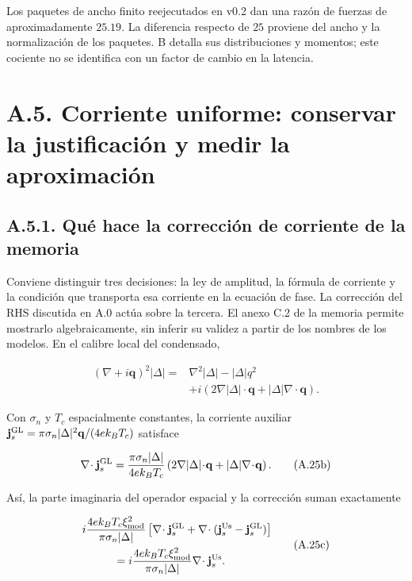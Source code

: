 \documentclass[
  spanish,
  10pt,
  a4paper,
]{article}
\begin{document}
Los paquetes de ancho finito reejecutados en v0.2 dan una razón de
fuerzas de aproximadamente \(25.19\). La diferencia respecto de \(25\)
proviene del ancho y la normalización de los paquetes. B detalla sus
distribuciones y momentos; este cociente no se identifica con un factor
de cambio en la latencia.

\section{A.5. Corriente uniforme: conservar la justificación y medir la
aproximación}\label{a.5.-corriente-uniforme-conservar-la-justificaciuxf3n-y-medir-la-aproximaciuxf3n}

\subsection{A.5.1. Qué hace la corrección de corriente de la
memoria}\label{a.5.1.-quuxe9-hace-la-correcciuxf3n-de-corriente-de-la-memoria}

Conviene distinguir tres decisiones: la ley de amplitud, la fórmula de
corriente y la condición que transporta esa corriente en la ecuación de
fase. La corrección del RHS discutida en A.0 actúa sobre la tercera. El
anexo C.2 de la memoria permite mostrarlo algebraicamente, sin inferir
su validez a partir de los nombres de los modelos. En el calibre local
del condensado,

\[
\begin{aligned}
(\nabla+i\mathbf q)^2|\Delta|
={}&\nabla^2|\Delta|-|\Delta|q^2\\
&+i\left(2\nabla|\Delta|\!\cdot\!\mathbf q
+|\Delta|\nabla\!\cdot\!\mathbf q\right).
\end{aligned}
\tag{A.25a}
\]

Con \(\sigma_n\) y \(T_c\) espacialmente constantes, la corriente
auxiliar
\(\mathbf j_s^{\rm GL}=\pi\sigma_n|\Delta|^2\mathbf q/(4ek_BT_c)\)
satisface

\[
\nabla\!\cdot\mathbf j_s^{\rm GL}
=\frac{\pi\sigma_n|\Delta|}{4ek_BT_c}
\left(2\nabla|\Delta|\!\cdot\!\mathbf q
+|\Delta|\nabla\!\cdot\!\mathbf q\right).
\tag{A.25b}
\]

Así, la parte imaginaria del operador espacial y la corrección suman
exactamente

\[
\begin{aligned}
&i\frac{4ek_BT_c\xi_{\rm mod}^2}{\pi\sigma_n|\Delta|}
\left[\nabla\!\cdot\mathbf j_s^{\rm GL}
+\nabla\!\cdot(\mathbf j_s^{\rm Us}-\mathbf j_s^{\rm GL})\right]\\
&\hspace{1cm}=
i\frac{4ek_BT_c\xi_{\rm mod}^2}{\pi\sigma_n|\Delta|}
\nabla\!\cdot\mathbf j_s^{\rm Us}.
\end{aligned}
\tag{A.25c}
\]
\end{document}
